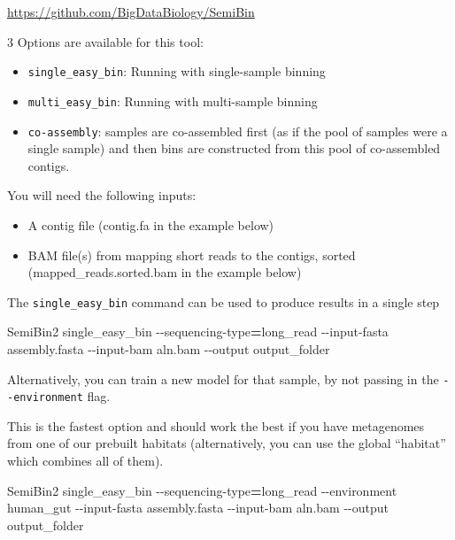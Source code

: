 \documentclass[
]{book}
\newenvironment{Shaded}{\begin{snugshade}}{\end{snugshade}}
\newcommand{\AttributeTok}[1]{\textcolor[rgb]{0.13,0.29,0.53}{#1}}
\newcommand{\ExtensionTok}[1]{#1}
\newcommand{\NormalTok}[1]{#1}
\newcommand{\OperatorTok}[1]{\textcolor[rgb]{0.81,0.36,0.00}{\textbf{#1}}}
\providecommand{\tightlist}{%
  \setlength{\itemsep}{0pt}\setlength{\parskip}{0pt}}
\begin{document}
\url{https://github.com/BigDataBiology/SemiBin}

3 Options are available for this tool:

\begin{itemize}
\tightlist
\item
  \texttt{single\_easy\_bin}: Running with single-sample binning
\item
  \texttt{multi\_easy\_bin}: Running with multi-sample binning
\item
  \texttt{co-assembly}: samples are co-assembled first (as if the pool of samples were a single sample) and then bins are constructed from this pool of co-assembled contigs.
\end{itemize}

You will need the following inputs:

\begin{itemize}
\tightlist
\item
  A contig file (contig.fa in the example below)
\item
  BAM file(s) from mapping short reads to the contigs, sorted (mapped\_reads.sorted.bam in the example below)
\end{itemize}

The \texttt{single\_easy\_bin} command can be used to produce results in a single step

\begin{Shaded}
\begin{Highlighting}[]
\ExtensionTok{SemiBin2}\NormalTok{ single\_easy\_bin }\AttributeTok{{-}{-}sequencing{-}type}\OperatorTok{=}\NormalTok{long\_read }\AttributeTok{{-}{-}input{-}fasta}\NormalTok{ assembly.fasta }\AttributeTok{{-}{-}input{-}bam}\NormalTok{ aln.bam }\AttributeTok{{-}{-}output}\NormalTok{ output\_folder}
\end{Highlighting}
\end{Shaded}

Alternatively, you can train a new model for that sample, by not passing in the \texttt{-\/-environment} flag.

This is the fastest option and should work the best if you have metagenomes from one of our prebuilt habitats (alternatively, you can use the global ``habitat'' which combines all of them).

\begin{Shaded}
\begin{Highlighting}[]
\ExtensionTok{SemiBin2}\NormalTok{ single\_easy\_bin }\AttributeTok{{-}{-}sequencing{-}type}\OperatorTok{=}\NormalTok{long\_read }\AttributeTok{{-}{-}environment}\NormalTok{ human\_gut }\AttributeTok{{-}{-}input{-}fasta}\NormalTok{ assembly.fasta }\AttributeTok{{-}{-}input{-}bam}\NormalTok{ aln.bam }\AttributeTok{{-}{-}output}\NormalTok{ output\_folder }
\end{Highlighting}
\end{Shaded}
\end{document}
